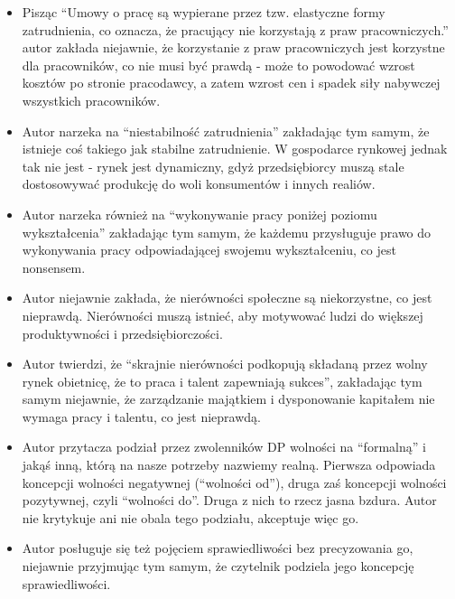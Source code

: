\documentclass[11pt]{article}
\begin{document}
\begin{itemize}
			\item Pisząc ``Umowy o pracę są wypierane przez tzw. elastyczne formy zatrudnienia, co oznacza, że pracujący nie korzystają z praw pracowniczych.'' autor zakłada niejawnie, że korzystanie z praw pracowniczych jest korzystne dla pracowników, co nie musi być prawdą - może to powodować wzrost kosztów po stronie pracodawcy, a zatem wzrost cen i spadek siły nabywczej wszystkich pracowników.
			\item Autor narzeka na ``niestabilność zatrudnienia'' zakładając tym samym, że istnieje coś takiego jak stabilne zatrudnienie. W gospodarce rynkowej jednak tak nie jest - rynek jest dynamiczny, gdyż przedsiębiorcy muszą stale dostosowywać produkcję do woli konsumentów i innych realiów.
			\item Autor narzeka również na ``wykonywanie pracy poniżej poziomu wykształcenia'' zakładając tym samym, że każdemu przysługuje prawo do wykonywania pracy odpowiadającej swojemu wykształceniu, co jest nonsensem.
			\item Autor niejawnie zakłada, że nierówności społeczne są niekorzystne, co jest nieprawdą. Nierówności muszą istnieć, aby motywować ludzi do większej produktywności i przedsiębiorczości.
			\item Autor twierdzi, że ``skrajnie nierówności podkopują składaną przez wolny rynek obietnicę, że to praca i talent zapewniają sukces'', zakładając tym samym niejawnie, że zarządzanie majątkiem i dysponowanie kapitałem nie wymaga pracy i talentu, co jest nieprawdą.
			\item Autor przytacza podział przez zwolenników DP wolności na ``formalną'' i jakąś inną, którą na nasze potrzeby nazwiemy realną. Pierwsza odpowiada koncepcji wolności negatywnej (``wolności od''), druga zaś koncepcji wolności pozytywnej, czyli ``wolności do''. Druga z nich to rzecz jasna bzdura. Autor nie krytykuje ani nie obala tego podziału, akceptuje więc go.
			\item Autor posługuje się też pojęciem sprawiedliwości bez precyzowania go, niejawnie przyjmując tym samym, że czytelnik podziela jego koncepcję sprawiedliwości.
		\end{itemize}
		
\end{document}
